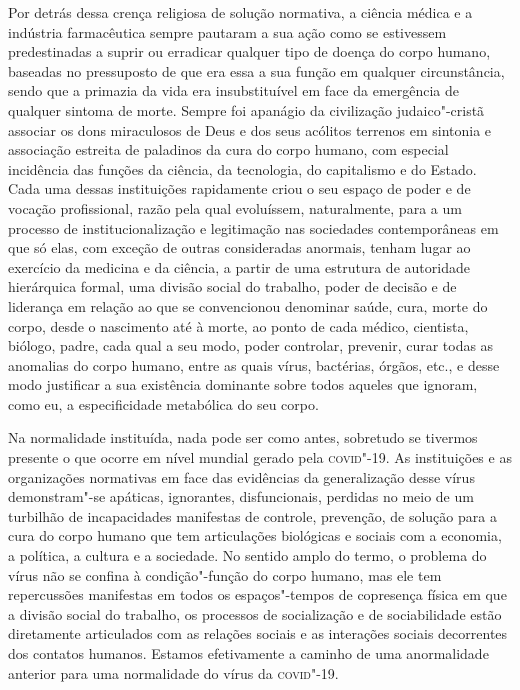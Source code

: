 Por detrás dessa crença religiosa de solução normativa, a ciência médica
e a indústria farmacêutica sempre pautaram a sua ação como se estivessem
predestinadas a suprir ou erradicar qualquer tipo de doença do corpo
humano, baseadas no pressuposto de que era essa a sua função em qualquer
circunstância, sendo que a primazia da vida era insubstituível em face
da emergência de qualquer sintoma de morte. Sempre foi apanágio da
civilização judaico"-cristã associar os dons miraculosos de Deus e dos
seus acólitos terrenos em sintonia e associação estreita de paladinos da
cura do corpo humano, com especial incidência das funções da ciência, da
tecnologia, do capitalismo e do Estado. Cada uma dessas instituições
rapidamente criou o seu espaço de poder e de vocação profissional, razão
pela qual evoluíssem, naturalmente, para a um processo de
institucionalização e legitimação nas sociedades contemporâneas em que
só elas, com exceção de outras consideradas anormais, tenham lugar ao
exercício da medicina e da ciência, a partir de uma estrutura de
autoridade hierárquica formal, uma divisão social do trabalho, poder de
decisão e de liderança em relação ao que se convencionou denominar
saúde, cura, morte do corpo, desde o nascimento até à morte, ao ponto de
cada médico, cientista, biólogo, padre, cada qual a seu modo, poder
controlar, prevenir, curar todas as anomalias do corpo humano, entre as
quais vírus, bactérias, órgãos, etc., e desse modo justificar a sua
existência dominante sobre todos aqueles que ignoram, como eu, a
especificidade metabólica do seu corpo.

Na normalidade instituída, nada pode ser como antes, sobretudo se
tivermos presente o que ocorre em nível mundial gerado pela \textsc{covid}"-19. As
instituições e as organizações normativas em face das evidências da
generalização desse vírus demonstram"-se apáticas, ignorantes,
disfuncionais, perdidas no meio de um turbilhão de incapacidades
manifestas de controle, prevenção, de solução para a cura do corpo
humano que tem articulações biológicas e sociais com a economia, a
política, a cultura e a sociedade. No sentido amplo do termo, o problema
do vírus não se confina à condição"-função do corpo humano, mas ele tem
repercussões manifestas em todos os espaços"-tempos de copresença física
em que a divisão social do trabalho, os processos de socialização e de
sociabilidade estão diretamente articulados com as relações sociais e as
interações sociais decorrentes dos contatos humanos. Estamos
efetivamente a caminho de uma anormalidade anterior para uma normalidade
do vírus da \textsc{covid}"-19.

